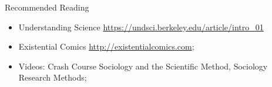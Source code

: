 \documentclass{beamer}
\begin{document}
\begin{CJK}{UTF8}{ipxm}
\begin{frame}{Recommended Reading}
  \begin{itemize}
    \item Understanding Science \url{https://undsci.berkeley.edu/article/intro_01}
    \item Existential Comics \url{http://existentialcomics.com};
    \item Videos: Crash Course Sociology and the Scientific Method, Sociology Research Methods;
  \end{itemize}
\end{frame}


\end{CJK}
\end{document}
